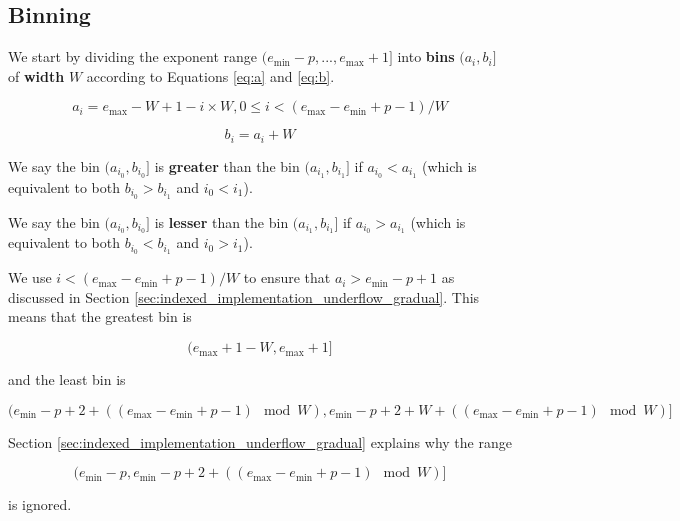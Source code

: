 \documentclass[12pt]{article}
\providecommand{\min}{\ensuremath{\text{min}}}
\providecommand{\max}{\ensuremath{\text{max}}}
\theoremstyle{definition}
\numberwithin{equation}{section}
\begin{document}
  \subsection{Binning}
    \label{sec:indexed_binning}
    We start by dividing the exponent range $(e_{\min} - p, ..., e_{\max} + 1]$ into \textbf{bins} $(a_i, b_i]$ of \textbf{width} $W$ according to Equations \ref{eq:a} and \ref{eq:b}.

    \begin{equation}
      a_i = e_{\max} - W + 1 - i\times W, 0 \leq i < (e_{\max} - e_{\min} + p - 1)/W
      \label{eq:a}
    \end{equation}

    \begin{equation}
      b_i = a_i + W
      \label{eq:b}
    \end{equation}

    We say the bin $(a_{i_0}, b_{i_0}]$ is \textbf{greater} than the bin $(a_{i_1}, b_{i_1}]$ if $a_{i_0} < a_{i_1}$ (which is equivalent to both $b_{i_0} > b_{i_1}$ and $i_0 < i_1$).

    We say the bin $(a_{i_0}, b_{i_0}]$ is \textbf{lesser} than the bin $(a_{i_1}, b_{i_1}]$ if $a_{i_0} > a_{i_1}$ (which is equivalent to both $b_{i_0} < b_{i_1}$ and $i_0 > i_1$).

    We use $i < (e_{\max} - e_{\min} + p - 1)/W$ to ensure that $a_i > e_{\min} - p + 1$ as discussed in Section \ref{sec:indexed_implementation_underflow_gradual}. This means that the greatest bin is

    \begin{equation}
      (e_{\max} + 1 - W, e_{\max} + 1]
      \label{eq:binmax}
    \end{equation}

    and the least bin is

    \begin{equation}
      (e_{\min} - p + 2 + ((e_{\max} - e_{\min} + p - 1)\mod W),
      e_{\min} - p + 2 + W + ((e_{\max} - e_{\min} + p - 1)\mod W)]
      \label{eq:binmin}
    \end{equation}

    Section \ref{sec:indexed_implementation_underflow_gradual} explains why the range

    \begin{equation*}
    (e_{\min} - p, e_{\min} - p + 2 + ((e_{\max} - e_{\min} + p - 1) \mod W)]
    \end{equation*}

    is ignored.
\end{document}
